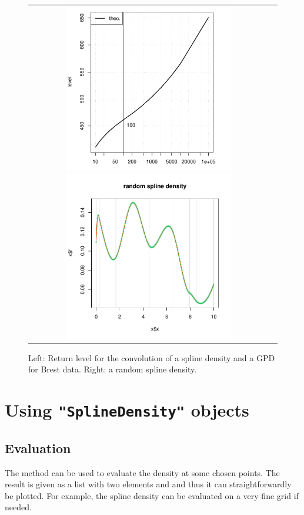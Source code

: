 \documentclass[11pt,a4paper]{report}\usepackage[]{graphicx}\usepackage[]{color}
\begin{document}
\begin{figure}
   \centering
   \begin{tabular}{c c} 
     \includegraphics[width=7.4cm]{Rgraphics/figSplineDens2-2.pdf}
     \includegraphics[width=7.4cm]{Rgraphics/figSplineDens3-1.pdf}
   \end{tabular}
   \caption{\label{SplineDens2-2} Left: Return level for the
     convolution of a spline density and a GPD for Brest data. Right:
     a random spline density.  }
\end{figure}



\section{Using \texttt{"SplineDensity"} objects}

\subsection{Evaluation}
 The \verb@predict@
method can be used to evaluate the density at some chosen points. The
result is given as a list with two elements \verb@x@ and \verb@y@ and
thus it can straightforwardly be plotted.
For example, the spline density can be evaluated on a very
fine grid if needed.
\end{document}
